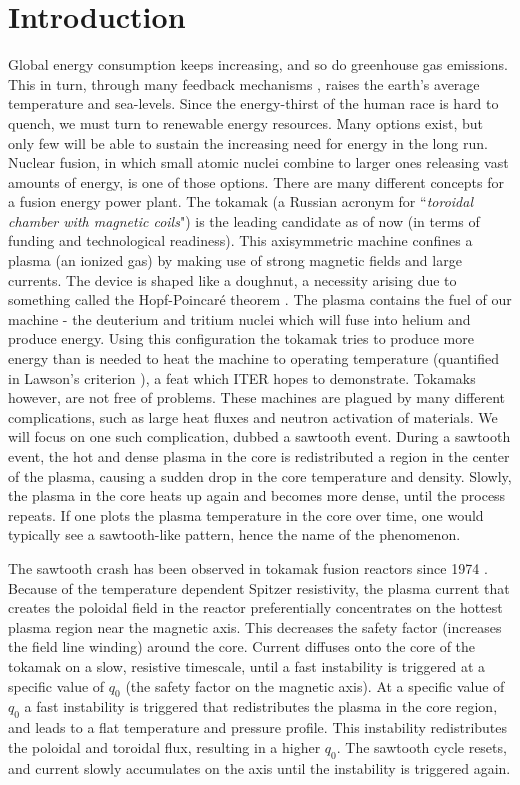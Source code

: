 \documentclass[%
superscriptaddress,
amsmath,amssymb,
aps,
pre,
floatfix,
]{revtex4-2}
\begin{document}
\section{Introduction}
Global energy consumption keeps increasing, and so do greenhouse gas emissions. This in turn, through many feedback mechanisms \cite{Curry1995,Bloom2010}, raises the earth's average temperature and sea-levels. Since the energy-thirst of the human race is hard to quench, we must turn to renewable energy resources. Many options exist, but only few will be able to sustain the increasing need for energy in the long run. Nuclear fusion, in which small atomic nuclei combine to larger ones releasing vast amounts of energy, is one of those options. 
There are many different concepts for a fusion energy power plant. The tokamak (a Russian acronym for ``\textit{toroidal chamber with magnetic coils}") is the leading candidate as of now (in terms of funding and technological readiness). This axisymmetric machine confines a plasma (an ionized gas) by making use of strong magnetic fields and large currents. The device is shaped like a doughnut, a necessity arising due to something called the Hopf-Poincar\'e theorem \cite{Milnor1997}. The plasma contains the fuel of our machine - the deuterium and tritium nuclei which will fuse into helium and produce energy. Using this configuration the tokamak tries to produce more energy than is needed to heat the machine to operating temperature (quantified in Lawson's criterion \cite{Lawson1957}), a feat which ITER hopes to demonstrate.
Tokamaks however, are not free of problems. These machines are plagued by many different complications, such as large heat fluxes and neutron activation of materials. We will focus on one such complication, dubbed a sawtooth event. During a sawtooth event, the hot and dense plasma in the core is redistributed a region in the center of the plasma, causing a sudden drop in the core temperature and density. Slowly, the plasma in the core heats up again and becomes more dense, until the process repeats. If one plots the plasma temperature in the core over time, one would typically see a sawtooth-like pattern, hence the name of the phenomenon.
\par
The sawtooth crash has been observed in tokamak fusion reactors since 1974 \cite{von1974studies, vershkov1974role}.
Because of the temperature dependent Spitzer resistivity, the plasma current that creates the poloidal field in the reactor preferentially concentrates on the hottest plasma region near the magnetic axis.
This decreases the safety factor (increases the field line winding) around the core.
Current diffuses onto the core of the tokamak on a slow, resistive timescale, until a fast instability is triggered at a specific value of $q_0$ (the safety factor on the magnetic axis).
At a specific value of $q_0$ a fast instability is triggered that redistributes the plasma in the core region, and leads to a flat temperature and pressure profile.
This instability redistributes the poloidal and toroidal flux, resulting in a higher $q_0$.
The sawtooth cycle resets, and current slowly accumulates on the axis until the instability is triggered again.
\end{document}
